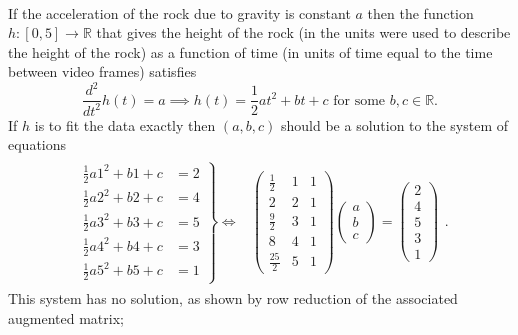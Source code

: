 \documentclass[12pt]{article}
\def\R{{\mathbb{R}}}
\def\b{\beta}
\def\bea{\begin{align}}
\def\eea{\end{align}}
\def\nn{\nonumber}
\def\bv{\left(\begin{array}{c}}
\def\ev{\end{array}\right) }
\def\LR{\Leftrightarrow}
\begin{document}
\\
If the acceleration of the rock due to gravity is constant $a$ then the function $h:[0,5]\to \R$ that gives the height of the rock (in the units were used to describe the height of the rock) as a function of time (in units of time equal to the time between video frames) satisfies 
\[ \frac{d^2}{dt^2} h(t)=a \implies h(t)=\frac12 a t^2+bt+c \text{~for~some~}b,c\in \R.\]
If $h$ is to fit the data exactly then $(a,b,c)$ should be a solution to the system of equations 
\bea \nn
\begin{array}{cc}
\left.
\begin{array}{cc}
\frac12a 1^2+b1+c &= 2 \\
\frac12a 2^2+b2+c &= 4 \\
\frac12a 3^2+b3+c &= 5 \\
\frac12a 4^2+b4+c &= 3 \\
\frac12a 5^2+b5+c &= 1 
\end{array}
\right\}\LR
& 
\begin{pmatrix}
\frac12 &1&1\\
2&2&1\\
\frac92 &3&1\\
8&4&1\\
\frac{25}{2} &5&1
\end{pmatrix}
\bv a\\b\\c \ev = \bv 2\\4\\5\\3\\1\ev
\end{array}.
\eea
This system has no solution, as shown by row reduction of the associated augmented matrix; 
\end{document}
